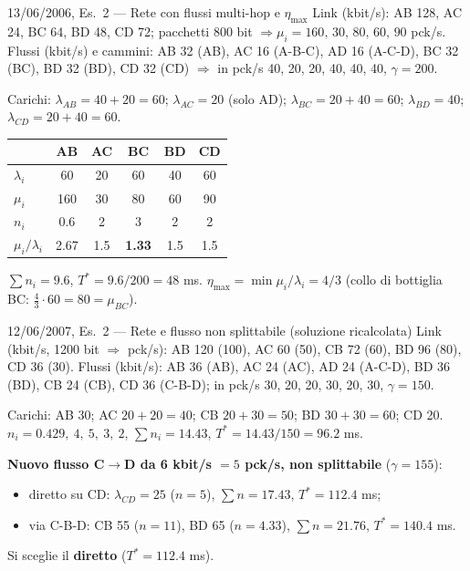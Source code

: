 \begin{esempio}{13/06/2006, Es.~2 --- Rete con flussi multi-hop e $\eta_{\max}$}
Link (kbit/s): AB 128, AC 24, BC 64, BD 48, CD 72; pacchetti 800 bit $\Rightarrow\mu_i=160,\,30,\,80,\,60,\,90$ pck/s. Flussi (kbit/s) e cammini: AB 32 (AB), AC 16 (A-B-C), AD 16 (A-C-D), BC 32 (BC), BD 32 (BD), CD 32 (CD) $\Rightarrow$ in pck/s 40, 20, 20, 40, 40, 40, $\gamma=200$.

Carichi: $\lambda_{AB}=40+20=60$; $\lambda_{AC}=20$ (solo AD); $\lambda_{BC}=20+40=60$; $\lambda_{BD}=40$; $\lambda_{CD}=20+40=60$.
\begin{center}\small
\begin{tabular}{lccccc}
\toprule & AB & AC & BC & BD & CD\\\midrule
$\lambda_i$ & 60 & 20 & 60 & 40 & 60\\ $\mu_i$ & 160 & 30 & 80 & 60 & 90\\
$n_i$ & 0.6 & 2 & 3 & 2 & 2\\ $\mu_i/\lambda_i$ & 2.67 & 1.5 & \textbf{1.33} & 1.5 & 1.5\\\bottomrule
\end{tabular}
\end{center}
$\sum n_i=9.6$, $T^*=9.6/200=48$ ms. $\eta_{\max}=\min\mu_i/\lambda_i=4/3$ (collo di bottiglia BC: $\tfrac43\cdot60=80=\mu_{BC}$).
\end{esempio}

\begin{esempio}{12/06/2007, Es.~2 --- Rete e flusso non splittabile (soluzione ricalcolata\mio)}
Link (kbit/s, 1200 bit $\Rightarrow$ pck/s): AB 120 (100), AC 60 (50), CB 72 (60), BD 96 (80), CD 36 (30). Flussi (kbit/s): AB 36 (AB), AC 24 (AC), AD 24 (A-C-D), BD 36 (BD), CB 24 (CB), CD 36 (C-B-D); in pck/s 30, 20, 20, 30, 20, 30, $\gamma=150$.

Carichi: AB 30; AC $20+20=40$; CB $20+30=50$; BD $30+30=60$; CD 20.
$n_i=0.429,\ 4,\ 5,\ 3,\ 2$, $\sum n_i=14.43$, $T^*=14.43/150=96.2$ ms.

\textbf{Nuovo flusso C$\to$D da 6 kbit/s $=5$ pck/s, non splittabile} ($\gamma=155$):
\begin{itemize}[nosep]
\item diretto su CD: $\lambda_{CD}=25$ ($n=5$), $\sum n=17.43$, $T^*=112.4$ ms;
\item via C-B-D: CB 55 ($n=11$), BD 65 ($n=4.33$), $\sum n=21.76$, $T^*=140.4$ ms.
\end{itemize}
Si sceglie il \textbf{diretto} ($T^*=112.4$ ms).
\end{esempio}

